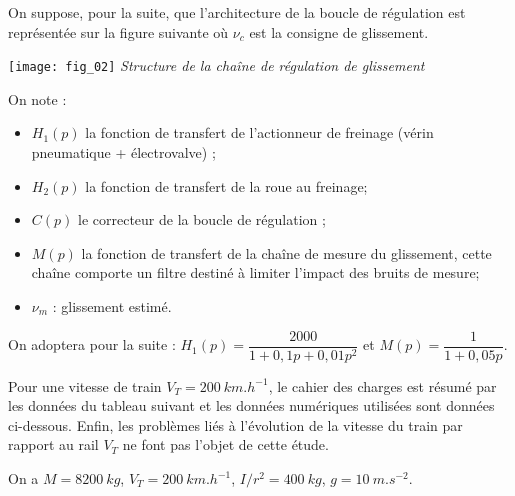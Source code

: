 \begin{multicols}{2}
On suppose, pour la suite, que l’architecture de la boucle de régulation est représentée sur la figure suivante où $\nu_c$ est la consigne de glissement.

\begin{center}
\texttt{[image: fig\_02]}
\textit{Structure de la chaîne de régulation de glissement}
\end{center}

On note : 
\begin{itemize}
\item $H_1(p)$ la fonction de transfert de l’actionneur de freinage (vérin pneumatique + électrovalve) ;
\item $H_2(p)$ la fonction de transfert de la roue au freinage;
\item $C(p)$ le correcteur de la boucle de régulation ;
\item $M(p)$ la fonction de transfert de la chaîne de mesure du glissement,%
 cette chaîne comporte un filtre destiné à limiter l’impact des bruits de mesure;
\item $\nu_m$ : glissement estimé.%
\end{itemize}
On adoptera pour la suite : $H_1(p)=\dfrac{2000}{1+0,1p+0,01p^2}$ et $M(p)=\dfrac{1}{1+0,05p}$.

Pour une vitesse de train $V_T=\SI{200}{km.h^{-1}}$, le cahier des charges est résumé par les données du tableau suivant et les données numériques utilisées sont données ci-dessous.
Enfin, les problèmes liés à l’évolution de la vitesse du train par rapport au rail $V_T$ ne font pas l’objet de cette étude.

On a $M=\SI{8200}{kg}$, $V_T=\SI{200}{km.h^{-1}}$, $I/r^2=\SI{400}{kg}$, $g=\SI{10}{m.s^{-2}}$.


\end{multicols}
